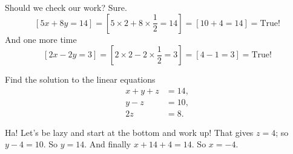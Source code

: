 \documentclass[12pt,fleqn,answers]{exam}
\begin{document}
\begin{questions}
\begin{solution}[3.0in]
   Should we check our work?  Sure. 
   \begin{equation*}    
      \left[5 x + 8y = 14\right] = \left[5 \times 2  + 8 \times \frac{1}{2} = 14\right] =
      \left[10 + 4 = 14\right] = \mbox{True!}      
   \end{equation*}
   And one more time
   \begin{equation*}    
      \left[2 x - 2 y = 3\right] = \left[2 \times 2  - 2 \times \frac{1}{2} = 3 \right] =
      \left[4 - 1 = 3\right] = \mbox{True!}      
   \end{equation*}
\end{solution}

\question [2] Find the solution to the linear equations
\begin{align*}
   x + y + z &= 14, \\
   y - z &= 10,\\
   2 z &= 8.
\end{align*}

\begin{solution} Ha! Let's be lazy and start at the bottom and work up! That gives $z=4$;
   so $y- 4 = 10$. So $y=14$. And finally $x + 14 + 4 = 14$. So $x = -4$.

\end{solution}

\end{questions}
\end{document}
